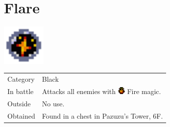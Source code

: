 \section{Flare}
\label{spell:flare}

\includegraphics[height=2cm,keepaspectratio]{./resources/spells/flare}

\begin{longtable}{ l p{9cm} }
	Category
	& Black
\\ %
	In battle
	& Attacks all enemies with \includegraphics[height=1em,keepaspectratio]{./resources/effects/fire} Fire magic.
\\ %
	Outside
	& No use.
\\ %
	Obtained
	& Found in a chest in Pazuzu’s Tower, 6F.
\end{longtable}
